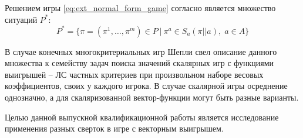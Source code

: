 \begin{Defenition}
	Решением игры \eqref{eq:ext_normal_form_game} согласно \cite{blackwell} 
	является множество ситуаций $P^*$:
	\begin{equation}
		P^* = \{ 
			\pi = (\pi^1, \ldots, \pi^m) \in P \: | \:
			\pi^a \in S_a(\pi || a), \; a \in A
		\}
		\label{eq:game_solution}
	\end{equation}
\end{Defenition}

В случае конечных многокритериальных игр Шепли свел \cite{shapley}
описание данного множества к семейству задач поиска значений 
скалярных игр с 
функциями выигрышей -- ЛС частных критериев при произвольном наборе
весовых коэффициентов, своих у каждого игрока.
В случае скалярной игры осреднение однозначно, а  для скаляризованной
вектор-функции могут быть разные варианты.

Целью данной выпускной квалификационной работы является исследование 
применения разных сверток в игре с векторным выигрышем.